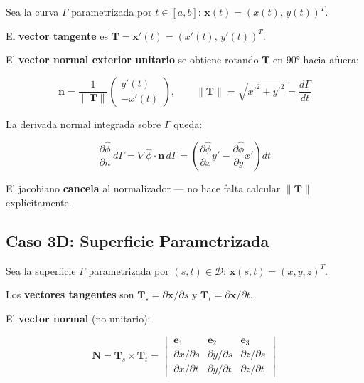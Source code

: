 \documentclass[12pt,a4paper]{article}
\begin{document}
Sea la curva $\Gamma$ parametrizada por $t\in[a,b]$:
$\mathbf{x}(t) = (x(t),\, y(t))^T$.

El \textbf{vector tangente} es $\mathbf{T} = \mathbf{x}'(t) = (x'(t),\,y'(t))^T$.

El \textbf{vector normal exterior unitario} se obtiene rotando $\mathbf{T}$
en $90°$ hacia afuera:

\begin{equation}
    \mathbf{n} = \frac{1}{\|\mathbf{T}\|}
    \begin{pmatrix} y'(t) \\ -x'(t) \end{pmatrix},
    \qquad \|\mathbf{T}\| = \sqrt{x'^2 + y'^2} = \frac{d\Gamma}{dt}
\end{equation}

La derivada normal integrada sobre $\Gamma$ queda:

\begin{equation}
    \frac{\partial\hat{\phi}}{\partial n}\,d\Gamma
    = \nabla\hat{\phi}\cdot\mathbf{n}\,d\Gamma
    = \left(\frac{\partial\hat{\phi}}{\partial x}y'
    - \frac{\partial\hat{\phi}}{\partial y}x'\right)dt
\end{equation}

El jacobiano \textbf{cancela} al normalizador — no hace falta calcular
$\|\mathbf{T}\|$ explícitamente.

\subsection{Caso 3D: Superficie Parametrizada}

Sea la superficie $\Gamma$ parametrizada por $(s,t)\in\mathcal{D}$:
$\mathbf{x}(s,t) = (x,y,z)^T$.

Los \textbf{vectores tangentes} son $\mathbf{T}_s = \partial\mathbf{x}/\partial s$
y $\mathbf{T}_t = \partial\mathbf{x}/\partial t$.

El \textbf{vector normal} (no unitario):

\begin{equation}
    \mathbf{N} = \mathbf{T}_s\times\mathbf{T}_t
    = \begin{vmatrix}
        \mathbf{e}_1 & \mathbf{e}_2 & \mathbf{e}_3 \\
        \partial x/\partial s & \partial y/\partial s & \partial z/\partial s \\
        \partial x/\partial t & \partial y/\partial t & \partial z/\partial t
    \end{vmatrix}
\end{equation}
\end{document}

